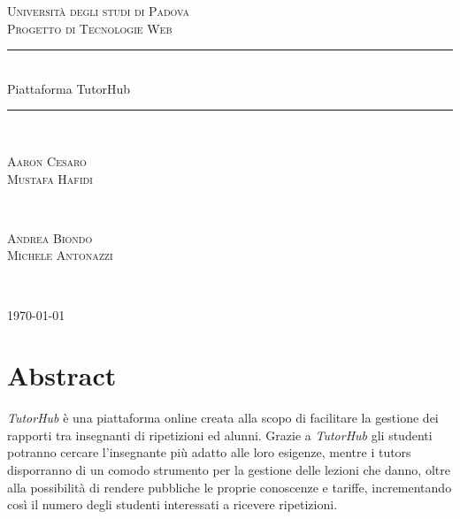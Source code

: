 \documentclass[12pt]{article}
\begin{document}
\begin{titlepage}

\newcommand{\HRule}{\rule{\linewidth}{0.2mm}}

\center
\vspace*{1cm\vfill}
\textsc{\LARGE Università degli studi di Padova}\\[4.5cm] 
\textsc{\Large Progetto di Tecnologie Web}\\[1cm]


\HRule \\[0.4cm]
{ \huge Piattaforma TutorHub}\\[0.15cm] 
\HRule \\[1.5cm]
 

\begin{minipage}{0.4\textwidth}
\begin{flushleft} \large
	\textsc{Aaron Cesaro} \\
	\textsc{Mustafa Hafidi} 
\end{flushleft}
\end{minipage}
~
\begin{minipage}{0.4\textwidth}
\begin{flushright} \large
	\textsc{Andrea Biondo}  \\
	\textsc{Michele Antonazzi}
\end{flushright}
\end{minipage}\\[4cm]

\vspace{\fill}

{\large \today}
\end{titlepage}



\tableofcontents
\newpage



\section*{Abstract}
\emph{TutorHub} \`e una piattaforma online creata alla scopo di facilitare la gestione dei rapporti tra insegnanti di ripetizioni ed alunni. Grazie a \emph{TutorHub} gli studenti potranno cercare l'insegnante pi\`u adatto alle loro esigenze, mentre i tutors disporranno di un comodo strumento per la gestione delle lezioni che danno, oltre alla possibilit\`a di rendere pubbliche le proprie conoscenze e tariffe, incrementando cos\`i il numero degli studenti interessati a ricevere ripetizioni.
\end{document}
